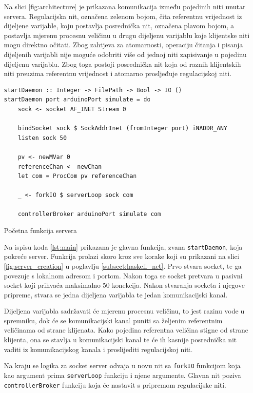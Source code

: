 Na slici \ref{fig:architecture} je prikazana komunikacija između pojedinih niti
unutar servera. Regulacijska nit, označena zelenom bojom, čita referentnu
vrijednost iz dijeljene varijable, koju postavlja posrednička nit, označena plavom
bojom, a postavlja mjerenu procesnu veličinu u drugu dijeljenu varijablu koje
klijentske niti mogu direktno očitati. Zbog zahtjeva za atomarnosti, operaciju
čitanja i pisanja dijeljenih varijabli nije moguće odobriti više od jednoj niti
zapisivanje u pojedinu dijeljenu varijablu. Zbog toga postoji posrednička nit
koja od raznih klijentskih niti preuzima referentnu vrijednost i atomarno
prosljeđuje regulacijskoj niti.

\begin{listing}[H]
\centering
\begin{verbatim}
startDaemon :: Integer -> FilePath -> Bool -> IO ()
startDaemon port arduinoPort simulate = do
    sock <- socket AF_INET Stream 0

    bindSocket sock $ SockAddrInet (fromInteger port) iNADDR_ANY
    listen sock 50

    pv <- newMVar 0
    referenceChan <- newChan
    let com = ProcCom pv referenceChan

    _ <- forkIO $ serverLoop sock com

    controllerBroker arduinoPort simulate com
\end{verbatim}
\caption{Početna funkcija servera}
\label{lst:main}
\end{listing}

Na ispisu koda \ref{lst:main} prikazana je glavna funkcija, zvana
\texttt{startDaemon}, koja pokreće server.
Funkcija prolazi skoro kroz sve korake koji su prikazani na slici
\ref{fig:server_creation} u poglavlju \ref{subsect:haskell_net}. Prvo stvara
socket, te ga povezuje s lokalnom adresom i portom. Nakon toga se socket
pretvara u pasivni socket koji prihvaća maksimalno 50 konekcija. Nakon stvaranja
socketa i njegove pripreme, stvara se jedna dijeljena varijabla te jedan
komunikacijski kanal.

Dijeljena varijabla sadržavati će mjerenu procesnu veličinu, to jest razinu vode
u spremniku, dok će se komunikacijski kanal puniti sa željenim referentnim
veličinama od strane klijenata. Kako pojedina referentna veličina stigne od
strane klijenta, ona se stavlja u komunikacijski kanal te će ih kasnije
posrednička nit vaditi iz komunikacijskog kanala i proslijediti
regulacijskoj niti.

Na kraju se logika za socket server odvaja u novu nit sa
\texttt{forkIO} funkcijom koja kao argument prima
\texttt{serverLoop} funkciju i njene argumente. Glavna nit poziva
\texttt{controllerBroker} funkciju koja će nastavit s pripremom
regulacijske niti.

